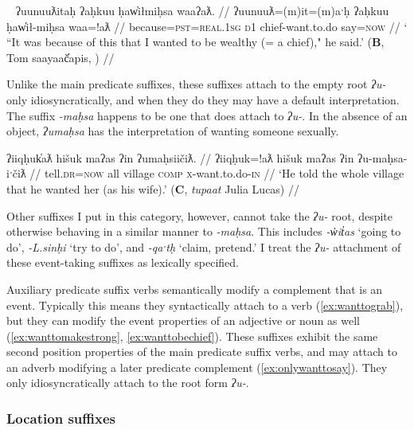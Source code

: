 \ex~ \label{ex:wanttobechief}
\begingl
\glpreamble ʔuunuuƛitaḥ ʔaḥkuu ḥaw̓iłmiḥsa waaʔaƛ. //
\gla ʔuunuuƛ=(m)it=(m)aˑḥ ʔaḥkuu ḥaw̓ił-miḥsa waa=!aƛ //
\glb because=\textsc{pst}=\textsc{real.1sg} \textsc{d1} chief-want.to.do say=\textsc{now} //
\glft ` ``It was because of this that I wanted to be wealthy (= a chief)," he said.' (\textbf{B}, Tom saayaač̓apis, \citealt[25]{sapir1955}) //
\endgl
\xe

Unlike the main predicate suffixes, these suffixes attach to the empty root \textit{ʔu-} only idiosyncratically, and when they do they may have a default interpretation. The suffix \textit{-maḥsa} happens to be one that does attach to \textit{ʔu-}. In the absence of an object, \textit{ʔumaḥsa} has the interpretation of wanting someone sexually.

\ex \label{ex:wanttomarry}
\begingl
\glpreamble ʔiiqḥuk̓aƛ hišuk maʔas ʔin ʔumaḥsiičiƛ. //
\gla ʔiiqḥuk=!aƛ hišuk maʔas ʔin ʔu-maḥsa-iˑčiƛ //
\glb tell.\textsc{dr}=\textsc{now} all village \textsc{comp} \textsc{x}-want.to.do-\textsc{in} //
\glft `He told the whole village that he wanted her (as his wife).' (\textbf{C}, \textit{tupaat} Julia Lucas) //
\endgl
\xe

Other suffixes I put in this category, however, cannot take the \textit{ʔu-} root, despite otherwise behaving in a similar manner to \textit{-maḥsa}. This includes \textit{-w̓it̓as} `going to do', \textit{-L.sinḥi} `try to do', and \textit{-qaˑtḥ} `claim, pretend.' I treat the \textit{ʔu-} attachment of these event-taking suffixes as lexically specified.

Auxiliary predicate suffix verbs semantically modify a complement that is an event. Typically this means they syntactically attach to a verb (\ref{ex:wanttograb}), but they can modify the event properties of an adjective or noun as well (\ref{ex:wanttomakestrong}, \ref{ex:wanttobechief}). These suffixes exhibit the same second position properties of the main predicate suffix verbs, and may attach to an adverb modifying a later predicate complement (\ref{ex:onlywanttosay}). They only idiosyncratically attach to the root form \textit{ʔu-}.

\subsubsection{Location suffixes} \label{ch:clause:2pv:loc}

